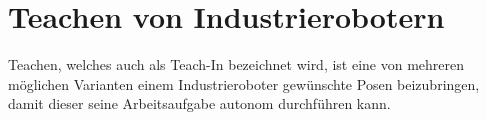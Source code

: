 

















\section{Teachen von Industrierobotern}
Teachen, welches auch als Teach-In bezeichnet wird, ist eine von mehreren möglichen Varianten einem Industrieroboter gewünschte Posen beizubringen, damit dieser seine Arbeitsaufgabe autonom durchführen kann.

